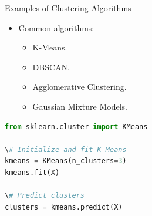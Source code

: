 \documentclass{beamer}
\begin{document}
\begin{frame}{Examples of Clustering Algorithms}
\begin{itemize}
    \item Common algorithms:
    \begin{itemize}
        \item K-Means.
        \item DBSCAN.
        \item Agglomerative Clustering.
        \item Gaussian Mixture Models.
    \end{itemize}
\end{itemize}
\begin{lstlisting}[language=Python, caption=Clustering with K-Means]
from sklearn.cluster import KMeans

\# Initialize and fit K-Means
kmeans = KMeans(n_clusters=3)
kmeans.fit(X)

\# Predict clusters
clusters = kmeans.predict(X)
\end{lstlisting}
\end{frame}
\end{document}
